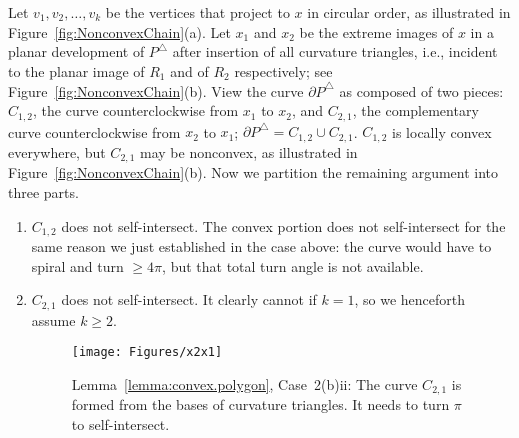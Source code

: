 \pdfoutput=1  \documentclass[]{article}
\newcommand{\hide}[1]{}
\newcommand{\ABox}{
\raisebox{3pt}{\framebox[6pt]{\rule{6pt}{0pt}}}
}
\newenvironment{proof}{{\bf Proof:}}{\hfill\ABox}
\newcommand{\figlab}[1]{\label{fig:#1}}
\newcommand{\lemref}[1]{\ref{lemma:#1}}
\newcommand{\figref}[1]{\ref{fig:#1}}
\def\o{{\omega}}
\def\a{{\alpha}}
\def\bP{{\partial P}}
\begin{document}
\begin{proof}
\begin{enumerate}
\begin{enumerate}
Let $v_1,v_2,\ldots,v_k$ be the vertices that project to $x$
in circular order,
as illustrated in Figure~\figref{NonconvexChain}(a).
\hide{
Insert the curvature triangles one by one, for $i=1,\ldots,k$.
The first rotates the ``elbow''
$R_1xv_1$ by $\o(v_1)$ about $v_1$ to an elbow with ray $A_1$,
the second insertion rotates the second elbow by $\o(v_2)$ about $v_2$,
and so on, as illustrated in~(b,c,d) of the figure.
Let $\a_i$ be the elbow angle at $x$, the angle between $R_1$ and $xv_i$ on $P$.
It must be that $\a_i \ge \pi/2$,
because $v_i x$ is a shortest path.
This angle condition ensures that 
successive elbows do not intersect, and so they 
bound between them ``quasicones'' with disjoint interiors, 
and disjoint
from the original cone delimited by $R_1$ and $R_2$,
which remains after the final rotation~(d).
}Let $x_1$ and $x_2$ be the extreme images of $x$ in a planar
development of $P^\triangle$
after insertion of all curvature triangles, i.e.,
incident to the planar image of $R_1$ and of $R_2$ respectively;
see Figure~\figref{NonconvexChain}(b).
View the curve $\bP^\triangle$ as composed of two pieces:
$C_{1,2}$, the curve counterclockwise from $x_1$ to $x_2$,
and $C_{2,1}$, the complementary curve counterclockwise from $x_2$
to $x_1$; $\bP^\triangle = C_{1,2} \cup C_{2,1}$.
$C_{1,2}$ is locally convex everywhere, but
$C_{2,1}$ may be nonconvex, as illustrated in Figure~\figref{NonconvexChain}(b).
Now we partition the remaining argument into three parts.

\begin{enumerate}
\item $C_{1,2}$ does not self-intersect.
The convex portion does not self-intersect for the same
reason we just established in the case above:
the curve would have to spiral and turn ${\ge}4\pi$, but
that total turn angle is not available.

\item $C_{2,1}$ does not self-intersect.
It clearly cannot if $k{=}1$, so we
henceforth assume $k \ge 2$.
\begin{figure}[htbp]
\centering
\texttt{[image: Figures/x2x1]}
\caption{Lemma~\protect\lemref{convex.polygon}, Case~2(b)ii: 
The curve $C_{2,1}$ is formed from the bases
of curvature triangles. It needs to turn $\pi$ to self-intersect.}
\figlab{x2x1}
\end{figure}



\end{enumerate}
\end{enumerate}
\end{enumerate}
\end{proof}
\end{document}
